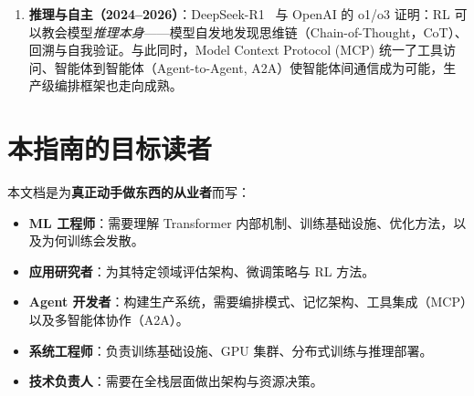 \documentclass[11pt,a4paper,openany]{book}
\begin{document}
\begin{enumerate}
  \item \textbf{推理与自主（2024--2026）}：DeepSeek-R1~\cite{deepseek2025r1} 与 OpenAI 的 o1/o3 证明：RL 可以教会模型\emph{推理本身}——模型自发地发现思维链（Chain-of-Thought，CoT）、回溯与自我验证。与此同时，Model Context Protocol (MCP) 统一了工具访问、智能体到智能体（Agent-to-Agent, A2A）使智能体间通信成为可能，生产级编排框架也走向成熟。
\end{enumerate}

\section*{本指南的目标读者}
\label{who-this-guide-is-for}

本文档是为\textbf{真正动手做东西的从业者}而写：

\begin{itemize}
  \item \textbf{ML 工程师}：需要理解 Transformer 内部机制、训练基础设施、优化方法，以及为何训练会发散。
  \item \textbf{应用研究者}：为其特定领域评估架构、微调策略与 RL 方法。
  \item \textbf{Agent 开发者}：构建生产系统，需要编排模式、记忆架构、工具集成（MCP）以及多智能体协作（A2A）。
  \item \textbf{系统工程师}：负责训练基础设施、GPU 集群、分布式训练与推理部署。
  \item \textbf{技术负责人}：需要在全栈层面做出架构与资源决策。
\end{itemize}
\end{document}
